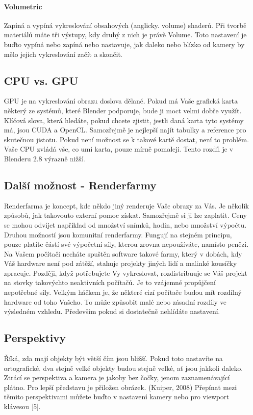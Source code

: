 \documentclass[12pt,a4paper]{report}
\begin{document}
	\paragraph{Volumetric} Zapíná a vypíná vykreslování obsahových (anglicky. volume) shaderů. Při
	tvorbě materiálů máte tři výstupy, kdy druhý z nich je právě Volume.
	Toto nastavení je buďto vypíná nebo zapíná nebo nastavuje, jak daleko
	nebo blízko od kamery by mělo jejich vykreslování začít a skončit.
	
	\subsection{CPU vs. GPU} GPU je na vykreslování obrazu doslova dělané. Pokud má Vaše grafická
	karta některý ze systémů, které Blender podporuje, bude ji moct velmi
	dobře využít. Klíčová slova, která hledáte, pokud chcete zjistit, jestli daná
	karta tyto systémy má, jsou CUDA a OpenCL. Samozřejmě je nejlepší
	najít tabulky a reference pro skutečnou jistotu. Pokud není možnost se k
	takové kartě dostat, není to problém. Vaše CPU zvládá vše, co umí karta,
	pouze mírně pomaleji. Tento rozdíl je v Blenderu 2.8 výrazně nižší.
	
	\subsection{Další možnost - Renderfarmy} Renderfarma je koncept, kde někdo jiný renderuje Vaše obrazy za Vás. Je
	několik způsobů, jak takovouto externí pomoc získat. Samozřejmě si ji lze
	zaplatit. Ceny se mohou odvíjet například od množství snímků, hodin,
	nebo množství výpočtu. Druhou možností jsou komunitní renderfarmy.
	Fungují na stejném principu, pouze platíte částí své výpočetní síly, kterou
	zrovna nepoužíváte, namísto penězi. Na Vašem počítači necháte spuštěn
	software takové farmy, který v dobách, kdy Váš hardware není pod
	zátěží, stahuje projekty jiných lidí a malinké kousíčky zpracuje. Později,
	když potřebujete Vy vykreslovat, rozdistribuuje se Váš projekt na stovky
	takovýchto neaktivních počítačů. Je to vzájemné propůjčení nepotřebné
	síly. Velkým háčkem je, že některé cizí počítače budou mít rozdílný
	hardware od toho Vašeho. To může způsobit malé nebo zásadní rozdíly ve
	výsledném vzhledu. Především pokud si dostatečně nehlídáte nastavení.
	
	\subsection{Perspektivy} 
	Říká, zda mají objekty být větší čím jsou bližší. Pokud toto nastavíte na
	ortografické, dva stejně velké objekty budou stejně velké, ať jsou jakkoli
	daleko. Ztrácí se perspektiva a kamera je jakoby bez čočky, jenom
	zaznamenávající plátno. Pro lepší představu je přiložen obrázek.
	(Kuiper, 2008)
	Přepínat mezi těmito perspektivami můžete buďto v nastavení kamery
	nebo pro viewport klávesou [5].
	
\end{document}
